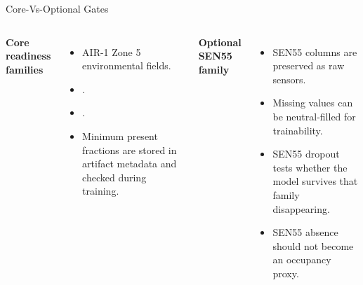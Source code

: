 \documentclass[aspectratio=169]{beamer}
\begin{document}
\begin{frame}[shrink=4]{Core-Vs-Optional Gates}
\begin{columns}[T,onlytextwidth]
\textbf{Core readiness families}
\begin{itemize}
  \item AIR-1 Zone 5 environmental fields.
  \item {}.
  \item {}.
  \item Minimum present fractions are stored in artifact metadata and checked during training.
\end{itemize}

\textbf{Optional SEN55 family}
\begin{itemize}
  \item SEN55 columns are preserved as raw sensors.
  \item Missing values can be neutral-filled for trainability.
  \item SEN55 dropout tests whether the model survives that family disappearing.
  \item SEN55 absence should not become an occupancy proxy.
\end{itemize}
\end{columns}
\tightsep
\begin{center}
\hspace{0.45em}
\hspace{0.45em}
\end{center}
\end{frame}
\end{document}
